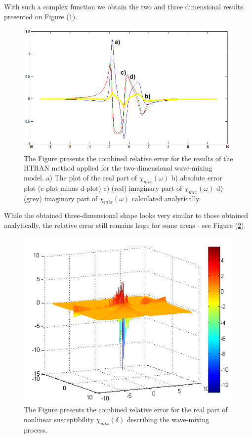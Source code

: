 \documentclass[12pt,twoside,a4paper]{article}
\numberwithin{equation}{subsection}
\numberwithin{figure}{subsection}
\begin{document}
With such a complex function we obtain the two and three dimensional results presented on Figure (\ref{fig:htran_mix_2d}).
 
\begin{figure}
  \includegraphics[width=150mm]{img/htran_fmix_2d.png}
  \caption{The Figure presents the combined relative error for the results of the HTRAN method applied for the two-dimensional wave-mixing model.
   a) The plot of the real part of ${\chi_{mix}}(\omega )$
   b) absolute error plot (c-plot minus d-plot)
   c) (red) imaginary part of  ${\chi_{mix}}(\omega )$
   d) (grey) imaginary part of ${\chi_{mix}}(\omega )$ calculated analytically.
   \label{fig:htran_mix_2d} }
\end{figure}

While the obtained three-dimensional shape looks very similar to those obtained analytically, the relative error still remains huge for some areas - see Figure (\ref{fig:htran_fmix_3derr}).

\begin{figure}
  \begin{center}
    \includegraphics{img/htran_fmix_3derr.png}
    \caption{The Figure presents the combined relative error for the real part of nonlinear susceptibility ${\chi_{mix}}(\delta )$ describing the wave-mixing process. \label{fig:htran_fmix_3derr}}
  \end{center}    
\end{figure}
\end{document}
